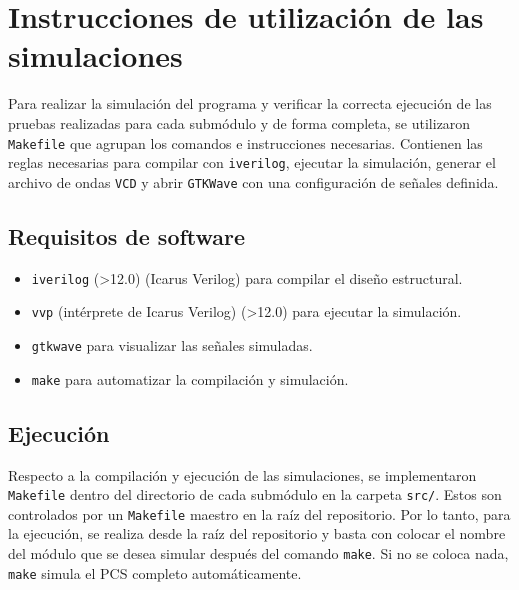 \section{Instrucciones de utilización de las simulaciones} \label{sec:instrucciones}

Para realizar la simulación del programa y verificar la correcta ejecución de las pruebas realizadas para cada submódulo y de forma completa, se utilizaron \texttt{Makefile} que agrupan los comandos e instrucciones necesarias.
Contienen las reglas necesarias para compilar con \texttt{iverilog}, ejecutar la simulación, generar el archivo de ondas \texttt{VCD} y abrir \texttt{GTKWave} con una configuración de señales definida.

\subsection*{Requisitos de software}

\begin{itemize}
  \item \texttt{iverilog} (>12.0) (Icarus Verilog) para compilar el diseño estructural.
  \item \texttt{vvp} (intérprete de Icarus Verilog) (>12.0) para ejecutar la simulación.
  \item \texttt{gtkwave} para visualizar las señales simuladas.
  \item \texttt{make} para automatizar la compilación y simulación.
\end{itemize}

\subsection*{Ejecución}

Respecto a la compilación y ejecución de las simulaciones, se implementaron \texttt{Makefile} dentro del directorio de cada submódulo en la carpeta \texttt{src/}.
Estos son controlados por un \texttt{Makefile} maestro en la raíz del repositorio.
Por lo tanto, para la ejecución, se realiza desde la raíz del repositorio y basta con colocar el nombre del módulo que se desea simular después del comando \texttt{make}.
Si no se coloca nada, \texttt{make} simula el PCS completo automáticamente.

